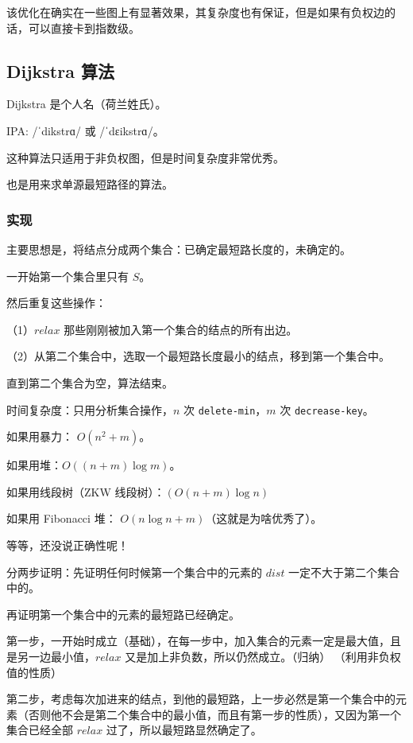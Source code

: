 该优化在确实在一些图上有显著效果，其复杂度也有保证，但是如果有负权边的话，可以直接卡到指数级。

\hr

\subsection{Dijkstra 算法}

Dijkstra 是个人名（荷兰姓氏）。

IPA: /ˈdikstrɑ/ 或 /ˈdɛikstrɑ/。

这种算法只适用于非负权图，但是时间复杂度非常优秀。

也是用来求单源最短路径的算法。

\subsubsection{实现}

主要思想是，将结点分成两个集合：已确定最短路长度的，未确定的。

一开始第一个集合里只有 $S$。

然后重复这些操作：

（1）$relax$ 那些刚刚被加入第一个集合的结点的所有出边。

（2）从第二个集合中，选取一个最短路长度最小的结点，移到第一个集合中。

直到第二个集合为空，算法结束。

时间复杂度：只用分析集合操作，$n$ 次 \texttt{delete-min}，$m$ 次 \texttt{decrease-key}。

如果用暴力： $O(n^2 + m)$。

如果用堆：$O((n+m) \log m)$。

如果用线段树（ZKW 线段树）：$(O(n+m)\log n)$

如果用 Fibonacci 堆： $O(n \log n + m)$（这就是为啥优秀了）。

等等，还没说正确性呢！

分两步证明：先证明任何时候第一个集合中的元素的 $dist$ 一定不大于第二个集合中的。

再证明第一个集合中的元素的最短路已经确定。

第一步，一开始时成立（基础），在每一步中，加入集合的元素一定是最大值，且是另一边最小值，$relax$ 又是加上非负数，所以仍然成立。（归纳） （利用非负权值的性质）

第二步，考虑每次加进来的结点，到他的最短路，上一步必然是第一个集合中的元素（否则他不会是第二个集合中的最小值，而且有第一步的性质），又因为第一个集合已经全部 $relax$ 过了，所以最短路显然确定了。

